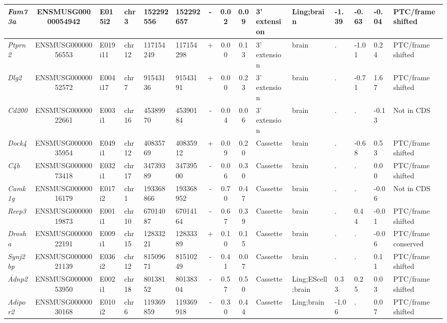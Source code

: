 \begin{landscape}
\begin{table}[htbp]
{\begin{tabular}{|l|c|l|l|l|l|c|c|c|l|l|l|l|l|l|}
		\textit{Fam73a} & ENSMUSG00000054942 & E015i2 & chr3  & 152292556 & 152292657 & -     & 0.02  & 0.09  & 3' extension & Ling;brain & -1.39 & -0.63 & -0.04 & PTC/frame shifted \\ \hline
		\textit{Ptprn2} & ENSMUSG00000056553 & E019i11 & chr12 & 117154249 & 117154298 & +     & 0.00  & 0.13  & 3' extension & brain & .     & -1.01 & 0.24  & PTC/frame shifted \\ \hline
		\textit{Dlg2} & ENSMUSG00000052572 & E004i17 & chr7  & 91543136 & 91543191 & +     & 0.00  & 0.23  & 3' extension & brain & .     & -0.71 & 1.67  & PTC/frame shifted \\ \hline
		\textit{Cd200} & ENSMUSG00000022661 & E003i1 & chr16 & 45389970 & 45390184 & -     & 0.04  & 0.06  & 3' extension & brain & .     & .     & -0.13 & Not in CDS \\ \hline
		\textit{Dock4} & ENSMUSG00000035954 & E049i1 & chr12 & 40835769 & 40835912 & +     & 0.09  & 0.20  & Cassette & brain & .     & -0.68 & 0.53  & PTC/frame shifted \\ \hline
		\textit{C4b} & ENSMUSG00000073418 & E032i1 & chr17 & 34739389 & 34739500 & -     & 0.06  & 0.30  & Cassette & brain & .     & .     & 0.00  & PTC/frame shifted \\ \hline
		\textit{Camk1g} & ENSMUSG00000016179 & E017i2 & chr1  & 193368866 & 193368952 & -     & 0.70  & 0.47  & Cassette & brain & .     & .     & -0.06 & Not in CDS  \\ \hline
		\textit{Reep3} & ENSMUSG00000019873 & E001i1 & chr10 & 67014087 & 67014164 & -     & 0.67  & 0.39  & Cassette & brain & .     & 0.44  & -0.01 & PTC/frame shifted \\ \hline
		\textit{Drosha} & ENSMUSG00000022191 & E009i1 & chr15 & 12833221 & 12833389 & +     & 0.10  & 0.15  & Cassette & brain & .     & .     & -0.06 & PTC/frame conserved \\ \hline
		\textit{Synj2bp} & ENSMUSG00000021139 & E036i2 & chr12 & 81509671 & 81510249 & -     & 0.41  & 0.07  & Cassette & brain & .     & .     & 0.11  & PTC/frame shifted \\ \hline
		\textit{Adnp2} & ENSMUSG00000053950 & E002i1 & chr18 & 80138152 & 80138304 & -     & 0.57  & 0.50  & Cassette & Ling;EScell;brain & 0.33  & 0.25  & 0.03  & PTC/frame shifted \\ \hline
		\textit{Adipor2} & ENSMUSG00000030168 & E010i2 & chr6  & 119369859 & 119369918 & -     & 0.30  & 0.44  & Cassette & Ling;brain & -1.06 & .     & 0.07  & PTC/frame shifted \\ \hline

\end{tabular}}
\end{table}
\end{landscape}
